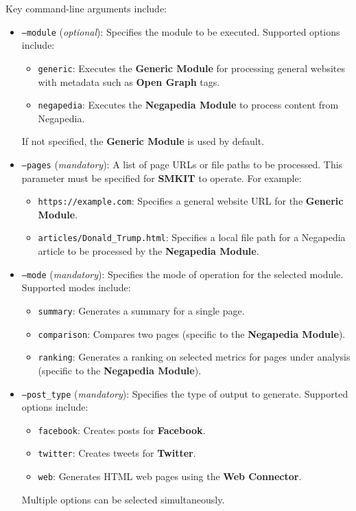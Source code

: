 Key command-line arguments include:

\begin{itemize}
    \item \texttt{--module} (\textit{optional}): Specifies the module to be executed. Supported options include:
    \begin{itemize}
        \item \texttt{generic}: Executes the \textbf{Generic Module} for processing general websites with metadata such as \textbf{Open Graph} tags.
        \item \texttt{negapedia}: Executes the \textbf{Negapedia Module} to process content from Negapedia.
    \end{itemize}
    If not specified, the \textbf{Generic Module} is used by default.

    \item \texttt{--pages} (\textit{mandatory}): A list of page URLs or file paths to be processed. This parameter must be specified for \textbf{SMKIT} to operate. For example:
    \begin{itemize}
        \item \texttt{https://example.com}: Specifies a general website URL for the \textbf{Generic Module}.
        \item \texttt{articles/Donald\_Trump.html}: Specifies a local file path for a Negapedia article to be processed by the \textbf{Negapedia Module}.
    \end{itemize}

    \item \texttt{--mode} (\textit{mandatory}): Specifies the mode of operation for the selected module. Supported modes include:
    \begin{itemize}
        \item \texttt{summary}: Generates a summary for a single page.
        \item \texttt{comparison}: Compares two pages (specific to the \textbf{Negapedia Module}).
        \item \texttt{ranking}: Generates a ranking on selected metrics for pages under analysis (specific to the \textbf{Negapedia Module}).
    \end{itemize}

    \item \texttt{--post\_type} (\textit{mandatory}): Specifies the type of output to generate. Supported options include:
    \begin{itemize}
        \item \texttt{facebook}: Creates posts for \textbf{Facebook}.
        \item \texttt{twitter}: Creates tweets for \textbf{Twitter}.
        \item \texttt{web}: Generates HTML web pages using the \textbf{Web Connector}.
    \end{itemize}
    Multiple options can be selected simultaneously.


\end{itemize}
